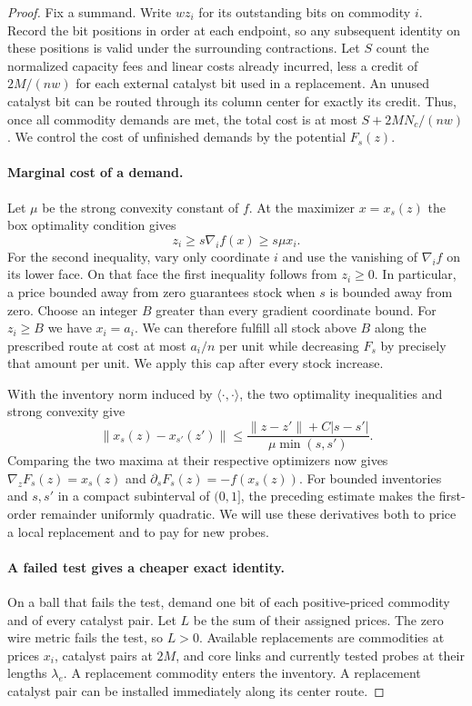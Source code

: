 \label{app:probing-proof}
\begin{proof}
Fix a summand. Write $wz_i$ for its outstanding bits on commodity $i$.
Record the bit positions in order at each endpoint, so any subsequent
identity on these positions is valid under the surrounding contractions.
Let $S$ count the normalized capacity fees and linear costs already
incurred, less a credit of $2M/(nw)$ for each external catalyst bit
used in a replacement. An unused catalyst bit can be routed through
its column center for exactly its credit. Thus, once all commodity
demands are met, the total cost is at most $S+2MN_c/(nw)$. We control
the cost of unfinished demands by the potential $F_s(z)$.

\paragraph{Marginal cost of a demand.}
Let $\mu$ be the strong convexity constant of $f$. At the maximizer
$x=x_s(z)$ the box optimality condition gives
\[
                        z_i\ge s\nabla_i f(x)\ge s\mu x_i .
\]
For the second inequality, vary only coordinate $i$ and use the
vanishing of $\nabla_i f$ on its lower face. On that face the first
inequality follows from $z_i\ge0$. In particular, a price bounded away
from zero guarantees stock when $s$ is bounded away from zero. Choose
an integer $B$ greater than every gradient coordinate bound. For
$z_i\ge B$ we have $x_i=a_i$. We can therefore fulfill all stock above
$B$ along the prescribed route at cost at most $a_i/n$ per unit while
decreasing $F_s$ by precisely that amount per unit. We apply this cap
after every stock increase.

With the inventory norm induced by $\langle\cdot,\cdot\rangle$, the
two optimality inequalities and strong convexity give
\[
 \|x_s(z)-x_{s'}(z')\|
       \le \frac{\|z-z'\|+C|s-s'|}{\mu\min(s,s')}.
\]
Comparing the two maxima at their respective optimizers now gives
$\nabla_z F_s(z)=x_s(z)$ and $\partial_s F_s(z)=-f(x_s(z))$.
For bounded inventories and $s,s'$ in a compact subinterval of
$(0,1]$, the preceding estimate makes the first-order remainder
uniformly quadratic. We will use these derivatives both to price a
local replacement and to pay for new probes.

\paragraph{A failed test gives a cheaper exact identity.}
On a ball that fails the test, demand one bit of each positive-priced
commodity and of every catalyst pair. Let $L$ be the sum of their
assigned prices. The zero wire metric fails the test, so $L>0$.
Available replacements are commodities at prices $x_i$, catalyst pairs
at $2M$, and core links and currently tested probes at their lengths
$\lambda_e$. A replacement commodity enters the inventory. A
replacement catalyst pair can be installed immediately along its center
route.


\end{proof}
